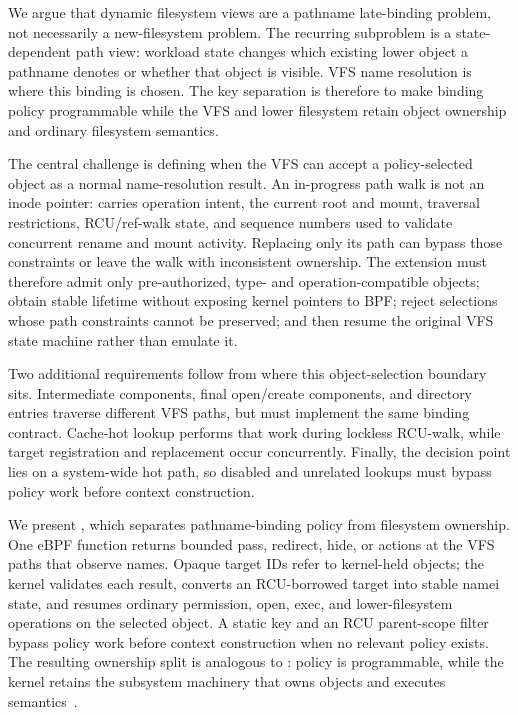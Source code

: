 We argue that dynamic filesystem views are a pathname late-binding problem,
not necessarily a new-filesystem problem. The recurring subproblem is a
state-dependent path view: workload state changes which existing lower object
a pathname denotes or whether that object is visible. VFS name resolution is
where this binding is chosen. The key separation is therefore to make binding
policy programmable while the VFS and lower filesystem retain object ownership
and ordinary filesystem semantics.

The central challenge is defining when the VFS can accept a policy-selected
object as a normal name-resolution result. An in-progress path walk is not an
inode pointer:  carries operation intent, the current root and
mount, traversal restrictions, RCU/ref-walk state, and sequence numbers used to
validate concurrent rename and mount activity. Replacing only its path can
bypass those constraints or leave the walk with inconsistent ownership. The
extension must therefore admit only pre-authorized, type- and
operation-compatible objects; obtain stable lifetime without exposing kernel
pointers to BPF; reject selections whose path constraints cannot be preserved;
and then resume the original VFS state machine rather than emulate it.

Two additional requirements follow from where this object-selection boundary
sits. Intermediate components, final open/create components, and directory
entries traverse different VFS paths, but must implement the same binding
contract. Cache-hot lookup performs that work during lockless RCU-walk, while
target registration and replacement occur concurrently. Finally, the decision
point lies on a system-wide hot path, so disabled and unrelated lookups must
bypass policy work before context construction.

We present \namei, which separates pathname-binding policy from filesystem
ownership. One eBPF function returns bounded pass, redirect, hide, or
 actions at the VFS paths that observe names. Opaque target
IDs refer to kernel-held  objects; the kernel validates each
result, converts an RCU-borrowed target into stable namei state, and resumes
ordinary permission, open, exec, and lower-filesystem operations on the
selected object. A static key and an RCU parent-scope filter bypass policy work
before context construction when no relevant policy exists. The resulting
ownership split is analogous to : policy is programmable,
while the kernel retains the subsystem machinery that owns objects and
executes semantics~\cite{linux_sched_ext}.

